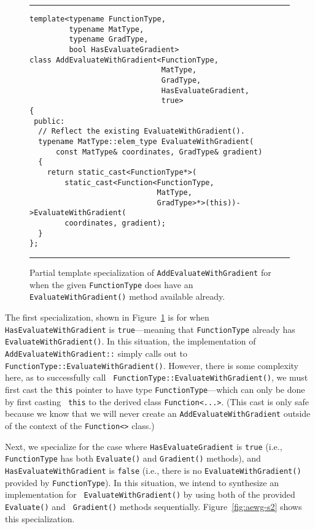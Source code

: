 \begin{figure}[b!]
\hrule
\vspace{1ex}
\begin{verbatim}
template<typename FunctionType,
         typename MatType,
         typename GradType,
         bool HasEvaluateGradient>
class AddEvaluateWithGradient<FunctionType,
                              MatType,
                              GradType,
                              HasEvaluateGradient,
                              true>
{
 public:
  // Reflect the existing EvaluateWithGradient().
  typename MatType::elem_type EvaluateWithGradient(
      const MatType& coordinates, GradType& gradient)
  {
    return static_cast<FunctionType*>(
        static_cast<Function<FunctionType,
                             MatType,
                             GradType>*>(this))->EvaluateWithGradient(
        coordinates, gradient);
  }
};
\end{verbatim}
\hrule
\vspace*{-0.5em}
\caption{Partial template specialization of {\tt AddEvaluateWithGradient} for
when the given {\tt FunctionType} does have an {\tt EvaluateWithGradient()}
method available already.}
\label{fig:aewg-s1}
\end{figure}

The first specialization, shown in Figure~\ref{fig:aewg-s1} is for when {\tt
HasEvaluateWithGradient} is {\tt true}---meaning that {\tt FunctionType} already
has {\tt EvaluateWithGradient()}.  In this situation, the implementation of {\tt
AddEvaluateWithGradient::} simply calls
out to {\tt FunctionType::EvaluateWithGradient()}.  However, there is some
complexity here, as to successfully call {\tt
FunctionType::EvaluateWithGradient()}, we must first cast the {\tt this} pointer
to have type {\tt FunctionType}---which can only be done by first casting {\tt
this} to the derived class {\tt Function<...>}.  (This cast is only safe because
we know that we will never create an {\tt AddEvaluateWithGradient} outside of
the context of the {\tt Function<>} class.)

Next, we specialize for the case where {\tt HasEvaluateGradient} is {\tt true}
(i.e., {\tt FunctionType} has both {\tt Evaluate()} and {\tt Gradient()}
methods), and {\tt HasEvaluateWithGradient} is {\tt false} (i.e., there is no
{\tt EvaluateWithGradient()} provided by {\tt FunctionType}).  In this
situation, we intend to synthesize an implementation for {\tt
EvaluateWithGradient()} by using both of the provided {\tt Evaluate()} and {\tt
Gradient()} methods sequentially.  Figure~\ref{fig:aewg-s2} shows this
specialization.

